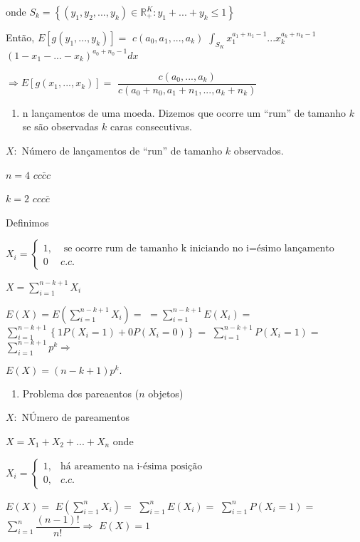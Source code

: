\documentclass[
]{book}
\providecommand{\tightlist}{%
  \setlength{\itemsep}{0pt}\setlength{\parskip}{0pt}}
\begin{document}
onde \(S_k = \left\{(y_1,y_2,...,y_k)\in \mathbb{R}^K_+: y_1+...+y_k \leq 1\right\}\)

Então, \(E[g(y_1,...,y_k)]=\) \(c(a_0,a_1,...,a_k)\) \(\int_{S_K}x_1^{a_1+n_1-1}...x_k^{a_k+n_k-1}\) \((1-x_1-...-x_k)^{a_0+n_0-1}dx\)

\(\Rightarrow E[g(x_1,...,x_k)]=\) \(\dfrac{c(a_0,...,a_k)}{c(a_0+n_0,a_1+n_1,...,a_k+n_k)}\)

\begin{enumerate}
\def\labelenumi{\arabic{enumi}.}
\setcounter{enumi}{6}
\tightlist
\item
  n lançamentos de uma moeda. Dizemos que ocorre um ``rum'' de tamanho \(k\) se são observadas \(k\) caras consecutivas.
\end{enumerate}

\(X:\) Número de lançamentos de ``run'' de tamanho \(k\) observados.

\(n=4\) \(cc\bar{c}c\)

\(k=2\) \(ccc\bar{c}\)

Definimos

\(X_i=\left\{\begin{array}{ll} 1, & \text{ se ocorre rum de tamanho k iniciando no i=ésimo lançamento}\\ 0 & c.c. \end{array}\right.\)

\(X=\sum_{i=1}^{n-k+1}X_i\)

\(E(X) = E\left(\sum_{i=1}^{n-k+1}X_i\right)=\) \(=\sum_{i=1}^{n-k+1}E(X_i)=\) \(\sum_{i=1}^{n-k+1}\left\{1P(X_i=1)+0P(X_i=0)\right\}=\) \(\sum_{i=1}^{n-k+1}P(X_i=1)=\) \(\sum_{i=1}^{n-k+1}p^k \Rightarrow\)

\(E(X)=(n-k+1)p^k.\)

\begin{enumerate}
\def\labelenumi{\arabic{enumi}.}
\setcounter{enumi}{7}
\tightlist
\item
  Problema dos pareaentos (\(n\) objetos)
\end{enumerate}

\(X:\) NÚmero de pareamentos

\(X = X_1+X_2+...+X_n\) onde

\(X_i=\left\{\begin{array}{ll} 1, & \text{há areamento na i-ésima posição}\\ 0, & c.c.\end{array}\right.\)

\(E(X)=\) \(E\left(\sum_{i=1}^n X_i\right)=\) \(\sum_{i=1}^n E(X_i)=\) \(\sum_{i=1}^nP(X_i=1)=\) \(\sum_{i=1}^n \dfrac{(n-1)!}{n!} \Rightarrow\) \(E(X)=1\)
\end{document}
